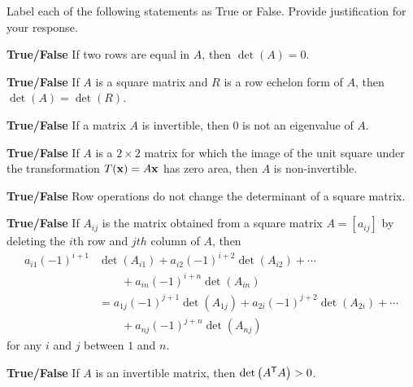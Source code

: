 		
\item Label each of the following statements as True or False. Provide justification for your response.
\ba
\item \textbf{True/False} If two rows are equal in $A$, then $\det(A)=0$.

\item \textbf{True/False} If $A$ is a square matrix and $R$ is a row echelon form of $A$, then $\det(A) = \det(R)$. 

\item \textbf{True/False} If a matrix $A$ is invertible, then 0 is not an eigenvalue of $A$.

\item \textbf{True/False} If $A$ is a $2\times 2$ matrix for which the image of the unit square under the transformation $T(\mathbf{x})=A\mathbf{x}$ has zero area, then $A$ is non-invertible.

\item \textbf{True/False} Row operations do not change the determinant of a square matrix. 

\item \textbf{True/False} If $A_{ij}$ is the matrix obtained from a square matrix $A = [a_{ij}]$ by deleting the $i$th row and $jth$ column of $A$, then 
\begin{align*}
a_{i1}(-1)^{i+1}&\det(A_{i1}) + a_{i2}(-1)^{i+2}\det(A_{i2}) + \cdots \\
	&\qquad + a_{in}(-1)^{i+n}\det(A_{in}) \\
	&=  a_{1j}(-1)^{j+1}\det(A_{1j}) + a_{2i}(-1)^{j+2}\det(A_{2i}) + \cdots \\
	&\qquad + a_{nj}(-1)^{j+n}\det(A_{nj})
\end{align*}
for any $i$ and $j$ between $1$ and $n$.  

\item \textbf{True/False} If $A$ is an invertible matrix, then $\det\left(A^{\mathsf{T}}A\right) > 0$.  

\ea

\ee
